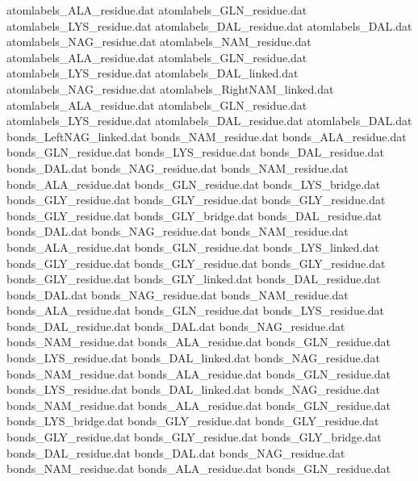 atomlabels_ALA_residue.dat      
atomlabels_GLN_residue.dat      
atomlabels_LYS_residue.dat      
atomlabels_DAL_residue.dat      
atomlabels_DAL.dat              
atomlabels_NAG_residue.dat      
atomlabels_NAM_residue.dat      
atomlabels_ALA_residue.dat      
atomlabels_GLN_residue.dat      
atomlabels_LYS_residue.dat      
atomlabels_DAL_linked.dat       
atomlabels_NAG_residue.dat      
atomlabels_RightNAM_linked.dat  
atomlabels_ALA_residue.dat      
atomlabels_GLN_residue.dat      
atomlabels_LYS_residue.dat      
atomlabels_DAL_residue.dat      
atomlabels_DAL.dat              
bonds_LeftNAG_linked.dat        
bonds_NAM_residue.dat           
bonds_ALA_residue.dat           
bonds_GLN_residue.dat           
bonds_LYS_residue.dat           
bonds_DAL_residue.dat           
bonds_DAL.dat                   
bonds_NAG_residue.dat           
bonds_NAM_residue.dat           
bonds_ALA_residue.dat           
bonds_GLN_residue.dat           
bonds_LYS_bridge.dat            
bonds_GLY_residue.dat
bonds_GLY_residue.dat
bonds_GLY_residue.dat
bonds_GLY_residue.dat
bonds_GLY_bridge.dat
bonds_DAL_residue.dat           
bonds_DAL.dat                   
bonds_NAG_residue.dat           
bonds_NAM_residue.dat           
bonds_ALA_residue.dat           
bonds_GLN_residue.dat           
bonds_LYS_linked.dat            
bonds_GLY_residue.dat
bonds_GLY_residue.dat
bonds_GLY_residue.dat
bonds_GLY_residue.dat
bonds_GLY_linked.dat
bonds_DAL_residue.dat           
bonds_DAL.dat                   
bonds_NAG_residue.dat           
bonds_NAM_residue.dat           
bonds_ALA_residue.dat           
bonds_GLN_residue.dat           
bonds_LYS_residue.dat           
bonds_DAL_residue.dat           
bonds_DAL.dat                   
bonds_NAG_residue.dat           
bonds_NAM_residue.dat           
bonds_ALA_residue.dat           
bonds_GLN_residue.dat           
bonds_LYS_residue.dat           
bonds_DAL_linked.dat            
bonds_NAG_residue.dat           
bonds_NAM_residue.dat           
bonds_ALA_residue.dat           
bonds_GLN_residue.dat           
bonds_LYS_residue.dat           
bonds_DAL_linked.dat            
bonds_NAG_residue.dat           
bonds_NAM_residue.dat           
bonds_ALA_residue.dat           
bonds_GLN_residue.dat           
bonds_LYS_bridge.dat            
bonds_GLY_residue.dat
bonds_GLY_residue.dat
bonds_GLY_residue.dat
bonds_GLY_residue.dat
bonds_GLY_bridge.dat
bonds_DAL_residue.dat           
bonds_DAL.dat                   
bonds_NAG_residue.dat           
bonds_NAM_residue.dat           
bonds_ALA_residue.dat           
bonds_GLN_residue.dat           
